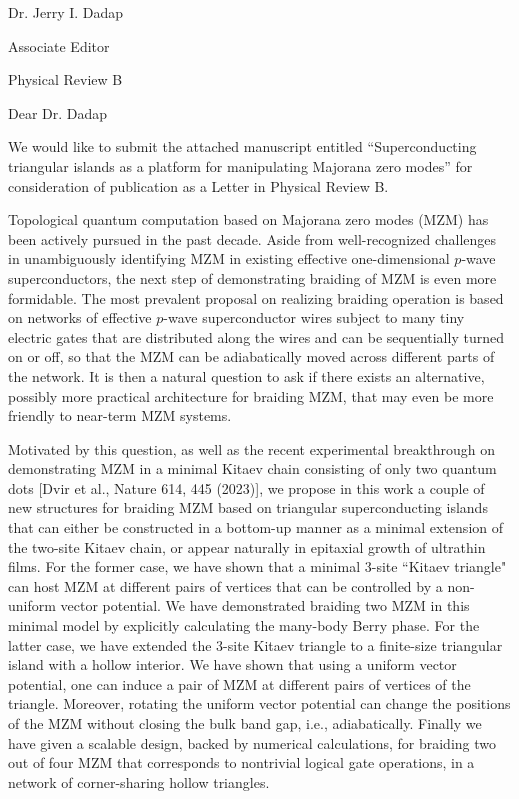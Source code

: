 \documentclass[11pt,letterpaper,roman]{moderncv}        %
\begin{document}
Dr. Jerry I. Dadap

Associate Editor

Physical Review B

\makelettertitle

Dear Dr. Dadap

We would like to submit the attached manuscript entitled ``Superconducting triangular islands as a platform for manipulating Majorana zero modes” for consideration of publication as a Letter in Physical Review B.

Topological quantum computation based on Majorana zero modes (MZM) has been actively pursued in the past decade. Aside from well-recognized challenges in unambiguously identifying MZM in existing effective one-dimensional $p$-wave superconductors, the next step of demonstrating braiding of MZM is even more formidable. The most prevalent proposal on realizing braiding operation is based on networks of effective $p$-wave superconductor wires subject to many tiny electric gates that are distributed along the wires and can be sequentially turned on or off, so that the MZM can be adiabatically moved across different parts of the network. It is then a natural question to ask if there exists an alternative, possibly more practical architecture for braiding MZM, that may even be more friendly to near-term MZM systems.

Motivated by this question, as well as the recent experimental breakthrough on demonstrating MZM in a minimal Kitaev chain consisting of only two quantum dots [Dvir et al., Nature 614, 445 (2023)], we propose in this work a couple of new structures for braiding MZM based on triangular superconducting islands that can either be constructed in a bottom-up manner as a minimal extension of the two-site Kitaev chain, or appear naturally in epitaxial growth of ultrathin films. For the former case, we have shown that a minimal 3-site ``Kitaev triangle" can host MZM at different pairs of vertices that can be controlled by a non-uniform vector potential. We have demonstrated braiding two MZM in this minimal model by explicitly calculating the many-body Berry phase. For the latter case, we have extended the 3-site Kitaev triangle to a finite-size triangular island with a hollow interior. We have shown that using a uniform vector potential, one can induce a pair of MZM at different pairs of vertices of the triangle. Moreover, rotating the uniform vector potential can change the positions of the MZM without closing the bulk band gap, i.e., adiabatically. Finally we have given a scalable design, backed by numerical calculations, for braiding two out of four MZM that corresponds to nontrivial logical gate operations, in a network of corner-sharing hollow triangles. 
\end{document}
